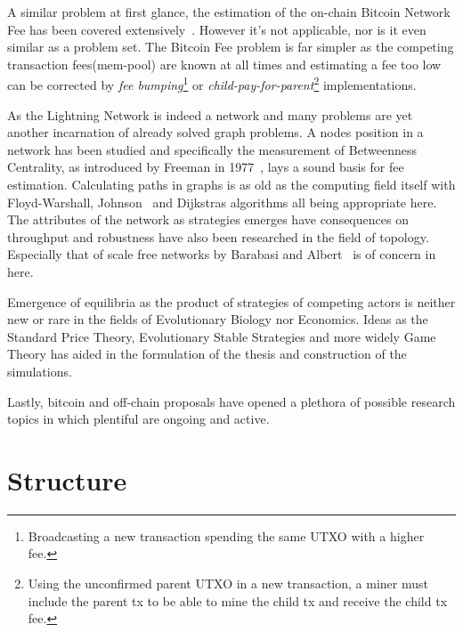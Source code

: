 	A similar problem at first glance, the estimation of the on-chain Bitcoin Network Fee has been covered extensively~\cite{mosterland:transaction:fee, houy:transaction:fee}. However it's not applicable, nor is it even similar as a problem set. The Bitcoin Fee problem is far simpler as the competing transaction fees(mem-pool) are known at all times and estimating a fee too low can be corrected by \textit{fee bumping}\footnote{Broadcasting a new transaction spending the same UTXO with a higher fee.} or \textit{child-pay-for-parent}\footnote{Using the unconfirmed parent UTXO in a new transaction, a miner must include the parent tx to be able to mine the child tx and receive the child tx fee.} implementations.
	
	As the Lightning Network is indeed a network and many problems are yet another incarnation of already solved graph problems. A nodes position in a network has been studied and specifically the measurement of Betweenness Centrality, as introduced by Freeman in 1977~\cite{brandes:betweenness:centrality:algorithm}, lays a sound basis for fee estimation. Calculating paths in graphs is as old as the computing field itself with Floyd-Warshall, Johnson~\cite{johnson:shortest:path:sparse:network} and Dijkstras algorithms all being appropriate here. The attributes of the network as strategies emerges have consequences on throughput and robustness have also been researched in the field of topology. Especially that of scale free networks by Barabasi and Albert~\cite{barabasi:albert:emergent:scaling} is of concern in here.
	
	Emergence of equilibria as the product of strategies of competing actors is neither new or rare in the fields of Evolutionary Biology nor Economics. Ideas as the Standard Price Theory, Evolutionary Stable Strategies and more widely Game Theory has aided in the formulation of the thesis and construction of the simulations.
	
	Lastly, \gls{bitcoin} and off-chain proposals have opened a plethora of possible research topics in which plentiful are ongoing and active.  
	
	
\section{Structure}

